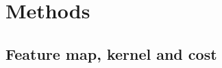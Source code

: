 \section{Methods}\label{sec:methods}

\subsection{Feature map, kernel and cost}\label{sec:featuremap}

